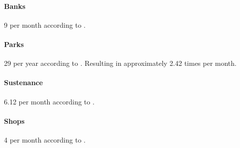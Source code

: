 \paragraph{Banks}
9 per month according to .

\paragraph{Parks}
29 per year according to .
Resulting in approximately 2.42 times per month.

\paragraph{Sustenance}
6.12 per month according to .

\paragraph{Shops}
4 per month according to .
